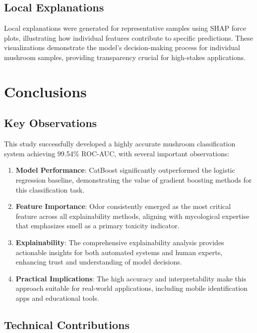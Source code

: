 \documentclass[11pt,a4paper]{article}
\begin{document}
\subsection{Local Explanations}

Local explanations were generated for representative samples using SHAP force plots, illustrating how individual features contribute to specific predictions. These visualizations demonstrate the model's decision-making process for individual mushroom samples, providing transparency crucial for high-stakes applications.

\section{Conclusions}
\label{sec:conclusion}

\subsection{Key Observations}

This study successfully developed a highly accurate mushroom classification system achieving 99.54\% ROC-AUC, with several important observations:

\begin{enumerate}
    \item \textbf{Model Performance}: CatBoost significantly outperformed the logistic regression baseline, demonstrating the value of gradient boosting methods for this classification task.
    
    \item \textbf{Feature Importance}: Odor consistently emerged as the most critical feature across all explainability methods, aligning with mycological expertise that emphasizes smell as a primary toxicity indicator.
    
    \item \textbf{Explainability}: The comprehensive explainability analysis provides actionable insights for both automated systems and human experts, enhancing trust and understanding of model decisions.
    
    \item \textbf{Practical Implications}: The high accuracy and interpretability make this approach suitable for real-world applications, including mobile identification apps and educational tools.
\end{enumerate}

\subsection{Technical Contributions}
\end{document}
